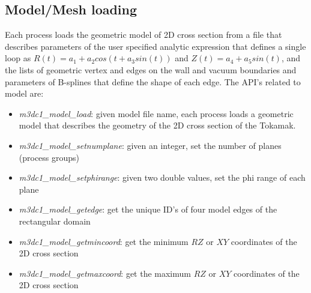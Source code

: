 \documentclass[11pt]{article}  %
\begin{document}
\subsection{Model/Mesh loading}\label{sec:step1}

Each process loads the geometric model of 2D cross section from a file that describes parameters of the user specified analytic expression that defines a single loop as $R(t)=a_1 + a_2cos\left(t + a_3sin(t)\right)$ and $Z(t)= a_4 + a_5sin(t)$, and the lists of geometric vertex and edges on the wall and vacuum boundaries and parameters of B-splines that define the shape of each edge. The API's related to model are:

\begin{itemize}
\item \emph{m3dc1\_model\_load}: given model file name, each process loads a geometric model that describes the geometry of the 2D cross section of the Tokamak. 
\item \emph{m3dc1\_model\_setnumplane}: given an integer, set the number of planes (process groups)
\item \emph{m3dc1\_model\_setphirange}: given two double values, set the phi range of each plane
\item \emph{m3dc1\_model\_getedge}: get the unique ID's of four model edges of the rectangular domain
\item \emph{m3dc1\_model\_getmincoord}: get the minimum $RZ$ or $XY$ coordinates of the 2D cross section
\item \emph{m3dc1\_model\_getmaxcoord}: get the maximum $RZ$ or $XY$ coordinates of the 2D cross section
\end{itemize}
\end{document}
